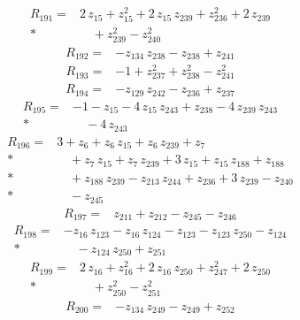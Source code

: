 \documentclass[10pt]{article}
\begin{document}
\begin{align*}
R_{191}={}& 2\,z_{15} + z_{15}^{2} + 2\,z_{15}\,z_{239} + z_{236}^{2} + 2\,z_{239} \\*
&\quad + z_{239}^{2} - z_{240}^{2}
\end{align*}
\begin{align*}
R_{192}={}& - z_{134}\,z_{238} - z_{238} + z_{241}
\end{align*}
\begin{align*}
R_{193}={}& - 1 + z_{237}^{2} + z_{238}^{2} - z_{241}^{2}
\end{align*}
\begin{align*}
R_{194}={}& - z_{129}\,z_{242} - z_{236} + z_{237}
\end{align*}
\begin{align*}
R_{195}={}& - 1 - z_{15} - 4\,z_{15}\,z_{243} + z_{238} - 4\,z_{239}\,z_{243} \\*
&\quad - 4\,z_{243}
\end{align*}
\begin{align*}
R_{196}={}& 3 + z_{6} + z_{6}\,z_{15} + z_{6}\,z_{239} + z_{7} \\*
&\quad + z_{7}\,z_{15} + z_{7}\,z_{239} + 3\,z_{15} + z_{15}\,z_{188} + z_{188} \\*
&\quad + z_{188}\,z_{239} - z_{213}\,z_{244} + z_{236} + 3\,z_{239} - z_{240} \\*
&\quad - z_{245}
\end{align*}
\begin{align*}
R_{197}={}& z_{211} + z_{212} - z_{245} - z_{246}
\end{align*}
\begin{align*}
R_{198}={}& - z_{16}\,z_{123} - z_{16}\,z_{124} - z_{123} - z_{123}\,z_{250} - z_{124} \\*
&\quad - z_{124}\,z_{250} + z_{251}
\end{align*}
\begin{align*}
R_{199}={}& 2\,z_{16} + z_{16}^{2} + 2\,z_{16}\,z_{250} + z_{247}^{2} + 2\,z_{250} \\*
&\quad + z_{250}^{2} - z_{251}^{2}
\end{align*}
\begin{align*}
R_{200}={}& - z_{134}\,z_{249} - z_{249} + z_{252}
\end{align*}
\end{document}
